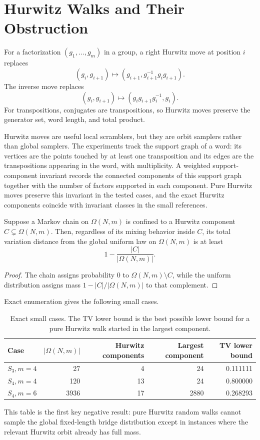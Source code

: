 \section{Hurwitz Walks and Their Obstruction}

For a factorization $(g_1,\ldots,g_m)$ in a group, a right Hurwitz move at
position $i$ replaces
\[
  (g_i,g_{i+1})
  \mapsto
  (g_{i+1}, g_{i+1}^{-1}g_i g_{i+1}).
\]
The inverse move replaces
\[
  (g_i,g_{i+1})
  \mapsto
  (g_i g_{i+1}g_i^{-1}, g_i).
\]
For transpositions, conjugates are transpositions, so Hurwitz moves preserve
the generator set, word length, and total product.

Hurwitz moves are useful local scramblers, but they are orbit samplers rather
than global samplers.  The experiments track the support graph of a word: its
vertices are the points touched by at least one transposition and its edges are
the transpositions appearing in the word, with multiplicity.  A weighted
support-component invariant records the connected components of this support
graph together with the number of factors supported in each component.  Pure
Hurwitz moves preserve this invariant in the tested cases, and the exact
Hurwitz components coincide with invariant classes in the small references.

\begin{proposition}
Suppose a Markov chain on $\Omega(N,m)$ is confined to a Hurwitz component
$C\subsetneq \Omega(N,m)$.  Then, regardless of its mixing behavior inside
$C$, its total variation distance from the global uniform law on
$\Omega(N,m)$ is at least
\[
  1-\frac{|C|}{|\Omega(N,m)|}.
\]
\end{proposition}

\begin{proof}
The chain assigns probability $0$ to $\Omega(N,m)\setminus C$, while the
uniform distribution assigns mass
$1-|C|/|\Omega(N,m)|$ to that complement.
\end{proof}

Exact enumeration gives the following small cases.

\begin{table}[ht]
\centering
\begin{tabular}{lrrrr}
\toprule
Case & $|\Omega(N,m)|$ & Hurwitz components & Largest component & TV lower bound \\
\midrule
$S_3,m=4$ & 27 & 4 & 24 & 0.111111 \\
$S_4,m=4$ & 120 & 13 & 24 & 0.800000 \\
$S_4,m=6$ & 3936 & 17 & 2880 & 0.268293 \\
\bottomrule
\end{tabular}
\caption{Exact small cases.  The TV lower bound is the best possible lower
bound for a pure Hurwitz walk started in the largest component.}
\label{tab:hurwitz-obstruction}
\end{table}

This table is the first key negative result: pure Hurwitz random walks cannot
sample the global fixed-length bridge distribution except in instances where
the relevant Hurwitz orbit already has full mass.
